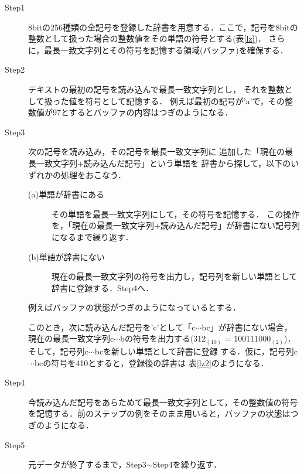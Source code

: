 \begin{description}
	\item [Step1] 8bitの256種類の全記号を登録した辞書を用意する．ここで，記号を8bitの整数として扱った場合の整数値をその単語の符号とする(表\ref{lz})．
	さらに，最長一致文字列とその符号を記憶する領域(バッファ)を確保する．

	\item [Step2] テキストの最初の記号を読み込んで最長一致文字列とし，
	それを整数として扱った値を符号として記憶する．
	例えば最初の記号が'a'で，その整数値が97とするとバッファの内容はつぎのようになる．

	\item [Step3] 次の記号を読み込み，その記号を最長一致文字列に
	追加した「現在の最長一致文字列+読み込んだ記号」という単語を
	辞書から探して，以下のいずれかの処理をおこなう．
	\begin{description}
		\item [(a)単語が辞書にある]
		その単語を最長一致文字列にして，その符号を記憶する．
		この操作を，「現在の最長一致文字列+読み込んだ記号」が辞書にない記号列になるまで繰り返す．
		\item [(b)単語が辞書にない]現在の最長一致文字列の符号を出力し，記号列を新しい単語として辞書に登録する．Step4へ．
	\end{description}
	例えばバッファの状態がつぎのようになっているとする．


	このとき，次に読み込んだ記号を'c'として「c$\cdots$bc」が辞書にない場合，
	現在の最長一致文字列c$\cdots$bの符号を出力する($312_{(10)}$ = $100111000_{(2)}$)．そして，記号列c$\cdots$bcを新しい単語として辞書に登録
	する．仮に，記号列c$\cdots$bcの符号を410とすると，登録後の辞書は
	表\ref{lz2}のようになる．

	\item [Step4] 今読み込んだ記号をあらためて最長一致文字列として，その整数値の符号を記憶する．前のステップの例をそのまま用いると，バッファの状態はつぎのようになる．


	\item [Step5] 元データが終了するまで，Step3$\sim$Step4を繰り返す．

\end{description}

